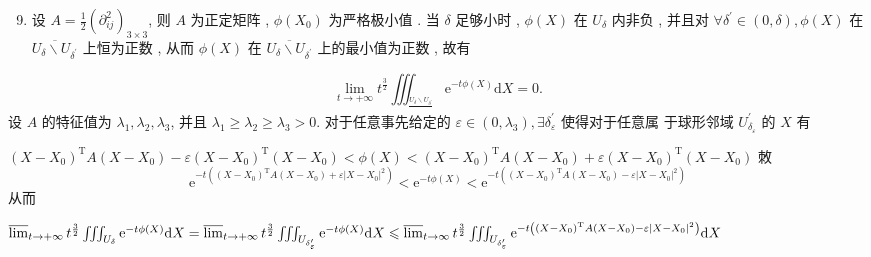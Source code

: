 \documentclass[10pt]{article}
\begin{document}
\begin{enumerate}
  \setcounter{enumi}{8}
  \item  设  $A=\frac{1}{2}\left(\partial_{i j}^{2}\right)_{3 \times 3}$,  则  $A$  为正定矩阵 , $\phi\left(X_{0}\right)$  为严格极小值 .  当  $\delta$  足够小时 , $\phi(X)$  在  $U_{\delta}$  内非负 ,  并且对  $\forall \delta^{\prime} \in(0, \delta), \phi(X)$  在  $\overline{U_{\delta} \backslash U_{\delta^{\prime}}}$  上恒为正数 ,  从而  $\phi(X)$  在  $\overline{U_{\delta} \backslash U_{\delta^{\prime}}}$  上的最小值为正数 ,  故有 
\end{enumerate}
$$
\lim _{t \rightarrow+\infty} t^{\frac{3}{2}} \iiint_{\frac{U_{\delta} \backslash U_{\delta^{\prime}}}{}} \mathrm{e}^{-t \phi(X)} \mathrm{d} X=0 .
$$
 设  $A$  的特征值为  $\lambda_{1}, \lambda_{2}, \lambda_{3}$,  并且  $\lambda_{1} \geqslant \lambda_{2} \geqslant \lambda_{3}>0$.  对于任意事先给定的  $\varepsilon \in\left(0, \lambda_{3}\right), \exists \delta_{\varepsilon}^{\prime}$  使得对于任意属   于球形邻域  $U_{\delta_{\varepsilon}}^{\prime}$  的  $X$  有 

$\left(X-X_{0}\right)^{\mathrm{T}} A\left(X-X_{0}\right)-\varepsilon\left(X-X_{0}\right)^{\mathrm{T}}\left(X-X_{0}\right)<\phi(X)<\left(X-X_{0}\right)^{\mathrm{T}} A\left(X-X_{0}\right)+\varepsilon\left(X-X_{0}\right)^{\mathrm{T}}\left(X-X_{0}\right)$  敇 
$$
\mathrm{e}^{-t\left(\left(X-X_{0}\right)^{\mathrm{T}} A\left(X-X_{0}\right)+\varepsilon\left|X-X_{0}\right|^{2}\right)}<\mathrm{e}^{-t \phi(X)}<\mathrm{e}^{-t\left(\left(X-X_{0}\right)^{\mathrm{T}} A\left(X-X_{0}\right)-\varepsilon\left|X-X_{0}\right|^{2}\right)}
$$
 从而 

$\varlimsup_{t \rightarrow+\infty} t^{\frac{3}{2}} \iiint_{U_{\delta}} \mathrm{e}^{-t \phi(X)} \mathrm{d} X=\varlimsup_{t \rightarrow+\infty} t^{\frac{3}{2}} \iiint_{U_{\delta_{\varepsilon}^{\prime}}} \mathrm{e}^{-t \phi(X)} \mathrm{d} X \leqslant \varlimsup_{t \rightarrow \infty} t^{\frac{3}{2}} \iiint_{U_{\delta_{\varepsilon}^{\prime}}} \mathrm{e}^{-t\left(\left(X-X_{0}\right)^{\mathrm{T}} A\left(X-X_{0}\right)-\varepsilon\left|X-X_{0}\right|^{2}\right)} \mathrm{d} X$
\end{document}

